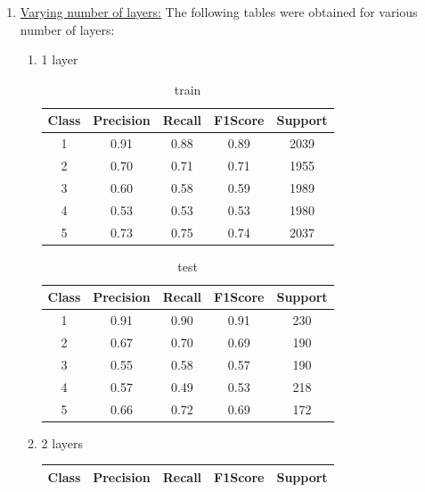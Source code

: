 \begin{enumerate}[label=(\alph*)]
    \newpage
    \item \underline{Varying number of layers:} The following tables were obtained for various number of layers:
    \begin{enumerate}[label=\roman*.]
        \item 1 layer
        \begin{table}[!htb]
            \centering
            \begin{tabular}{ccccc}
            \hline
            Class & Precision & Recall & F1Score & Support \\ \hline
            1     & 0.91      & 0.88   & 0.89    & 2039    \\
            2     & 0.70      & 0.71   & 0.71    & 1955    \\
            3     & 0.60      & 0.58   & 0.59    & 1989    \\
            4     & 0.53      & 0.53   & 0.53    & 1980    \\
            5     & 0.73      & 0.75   & 0.74    & 2037    \\ \hline
            \end{tabular}
            \caption{train}
            \label{part c train depth 1}
        \end{table}
        \begin{table}[!htb]
            \centering
            \begin{tabular}{ccccc}
            \hline
            Class & Precision & Recall & F1Score & Support \\ \hline
            1     & 0.91      & 0.90   & 0.91    & 230     \\
            2     & 0.67      & 0.70   & 0.69    & 190     \\
            3     & 0.55      & 0.58   & 0.57    & 190     \\
            4     & 0.57      & 0.49   & 0.53    & 218     \\
            5     & 0.66      & 0.72   & 0.69    & 172     \\ \hline
            \end{tabular}
            \caption{test}
            \label{part c test depth 1}
        \end{table}
        \item 2 layers
        \begin{table}[!htb]
            \centering
            \begin{tabular}{ccccc}
            \hline
            Class & Precision & Recall & F1Score & Support \\ \hline

\end{tabular}
\end{table}
\end{enumerate}
\end{enumerate}
